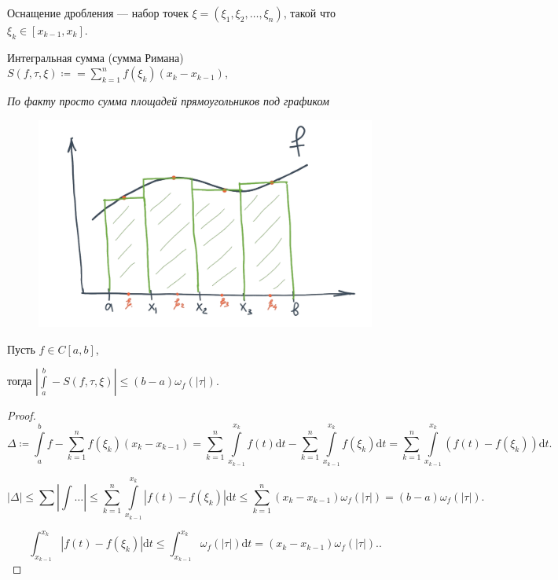 \begin{definition}
    Оснащение дробления --- набор точек $\xi = ( \xi_1, \xi_2, \ldots, \xi_n)$, такой что $\xi_k \in [x_{k-1}, x_k]$.
\end{definition}
\begin{definition}
    Интегральная сумма (сумма Римана) $S(f, \tau, \xi) \coloneqq = \sum\limits_{k=1}^n f(\xi_k)(x_k - x_{k-1})$, 

    \textit{По факту просто сумма площадей прямоугольников под графиком}
    \begin{figure}[h!]
    	\includegraphics[scale=0.2]{riemann_sum}
    \end{figure}
\end{definition}
\begin{theorem}
    Пусть $f \in C[a, b]$,

    тогда  $|\int\limits_a^b - S(f, \tau, \xi)| \le (b-a)\omega_f(|\tau|)$.
\end{theorem}
\begin{proof}
    \[\Delta \coloneqq \int\limits_a^b f - \sum\limits_{k=1}^n f(\xi_k)(x_k - x_{k-1}) = \sum\limits_{k=1}^n \int\limits_{x_{k-1}}^{x_k} f(t)\mathrm{d}t - \sum\limits_{k=1}^n \int\limits_{x_{k-1}}^{x_k}f(\xi_k) \mathrm{d}t = \sum\limits_{k=1}^n \int\limits_{x_{k-1}}^{x_k}(f(t) - f(\xi_k))\mathrm{d}t.\] 

    \[|\Delta| \le \sum |\int \ldots| \le \sum\limits_{k=1}^n \int\limits_{x_{k-1}}^{x_k} |f(t) - f(\xi_k)| \mathrm{d}t \le \sum_{k=1}^n (x_k - x_{k-1})\omega_f(|\tau|) = (b-a)\omega_f(|\tau|).\]

    \[
        \int_{x_{k-1}}^{x_k} |f(t) - f(\xi_k)| \mathrm{d}t \le \int_{x_{k-1}}^{x_k} \omega_f(|\tau|) \mathrm{d}t = (x_k - x_{k-1}) \omega_f(|\tau|).
    .\] 
\end{proof}
